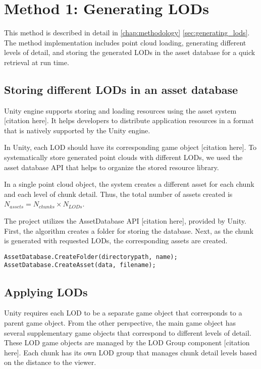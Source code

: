 \section{Method 1: Generating LODs}

This method is described in detail in \autoref{chap:methodology} \autoref{sec:generating_lods}. The method implementation includes point cloud loading, generating different levels of detail, and storing the generated LODs in the asset database for a quick retrieval at run time.

\subsection{Storing different LODs in an asset database}

Unity engine supports storing and loading resources using the asset system [citation here]. It helps developers to distribute application resources in a format that is natively supported by the Unity engine.

In Unity, each LOD should have its corresponding game object [citation here]. To systematically store generated point clouds with different LODs, we used the asset database API that helps to organize the stored resource library.

In a single point cloud object, the system creates a different asset for each chunk and each level of chunk detail. Thus, the total number of assets created is $N_{assets}=N_{chunks}\times N_{LODs}$.

The project utilizes the AssetDatabase API [citation here], provided by Unity. First, the algorithm creates a folder for storing the database. Next, as the chunk is generated with requested LODs, the corresponding assets are created.

\begin{lstlisting}[language={[Sharp]C}, caption=Asset database API usage example.]
AssetDatabase.CreateFolder(directorypath, name);
AssetDatabase.CreateAsset(data, filename);
\end{lstlisting}

\subsection{Applying LODs}

Unity requires each LOD to be a separate game object that corresponds to a parent game object. From the other perspective, the main game object has several supplementary game objects that correspond to different levels of detail. These LOD game objects are managed by the LOD Group component [citation here]. Each chunk has its own LOD group that manages chunk detail levels based on the distance to the viewer.

